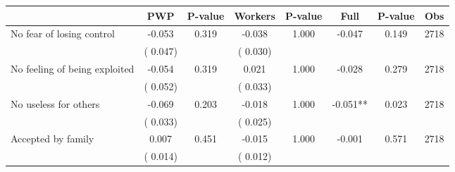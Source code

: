 
\begin{tabular}{l*{7}{c}}\hline&\multicolumn{1}{c}{PWP}&\multicolumn{1}{c}{P-value}&\multicolumn{1}{c}{Workers}&\multicolumn{1}{c}{P-value}&\multicolumn{1}{c}{Full}&\multicolumn{1}{c}{P-value}&\multicolumn{1}{c}{Obs} \\ \hline

 No fear of losing control       &             -0.053       &        0.319  &             -0.038       &        1.000  &             -0.047       &              0.149 &  2718 \\ 
                       &       (       0.047)             &                               &       (       0.030)                     &                               &                                               &                                &                      \\ 

 No feeling of being exploited       &             -0.054       &        0.319  &              0.021       &        1.000  &             -0.028       &              0.279 &  2718 \\ 
                       &       (       0.052)             &                               &       (       0.033)                     &                               &                                               &                                &                      \\ 

 No useless for others       &             -0.069       &        0.203  &             -0.018       &        1.000  &             -0.051**       &              0.023 &  2718 \\ 
                       &       (       0.033)             &                               &       (       0.025)                     &                               &                                               &                                &                      \\ 

 Accepted by family       &              0.007       &        0.451  &             -0.015       &        1.000  &             -0.001       &              0.571 &  2718 \\ 
                       &       (       0.014)             &                               &       (       0.012)                     &                               &                                               &                                &                      \\ 


\end{tabular}
